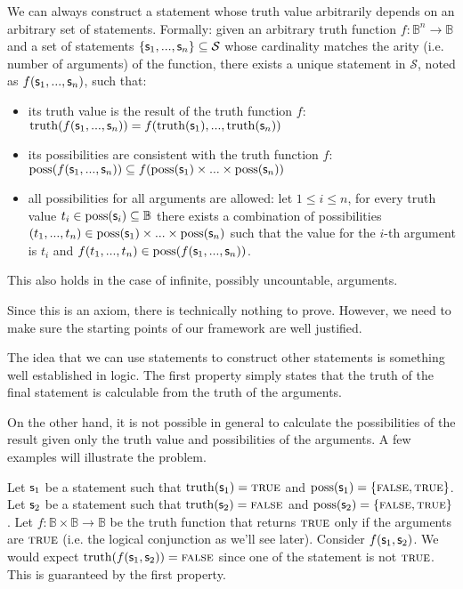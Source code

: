 \documentclass[11pt,letterpaper,fleqn]{memoir} %
\begin{document}
\begin{mathSection}
	\begin{axiom}\label{def_functions_of_statement}
		We can always construct a statement whose truth value arbitrarily depends on an arbitrary set of statements. Formally: given an arbitrary truth function $f : \mathbb{B}^n \to \mathbb{B}$ and a set of statements $\{\mathsf{s}_1, ..., \mathsf{s}_n\} \subseteq \mathcal{S}$  whose cardinality matches the arity (i.e. number of arguments) of the function, there exists a unique statement in $\mathcal{S}$, noted as $f(\mathsf{s}_1, ..., \mathsf{s}_n)$, such that:
		\begin{itemize}
			\item its truth value is the result of the truth function $f$: \newline $\operatorname{truth}(f(\mathsf{s}_1, ..., \mathsf{s}_n)) = f(\operatorname{truth}(\mathsf{s}_1), ..., \operatorname{truth}(\mathsf{s}_n))$
			\item its possibilities are consistent with the truth function $f$: \newline $\operatorname{poss}(f(\mathsf{s}_1, ..., \mathsf{s}_n)) \subseteq f(\operatorname{poss}(\mathsf{s}_1) \times ... \times \operatorname{poss}(\mathsf{s}_n))$
			\item all possibilities for all arguments are allowed:
			\newline let $1 \leq i \leq n$, for every truth value $t_i \in \operatorname{poss}(\mathsf{s}_i) \subseteq \mathbb{B}$ there exists a combination of possibilities $(t_1, ..., t_n) \in \operatorname{poss}(\mathsf{s}_1) \times ... \times \operatorname{poss}(\mathsf{s}_n)$ such that the value for the $i$-th argument is $t_i$ and  $f(t_1, ..., t_n) \in \operatorname{poss}(f(\mathsf{s}_1, ..., \mathsf{s}_n))$.
		\end{itemize}
	This also holds in the case of infinite, possibly uncountable, arguments.
	\end{axiom}
	\begin{justification}
		Since this is an axiom, there is technically nothing to prove. However, we need to make sure the starting points of our framework are well justified.
		
		The idea that we can use statements to construct other statements is something well established in logic. The first property simply states that the truth of the final statement is calculable from the truth of the arguments.
		
		On the other hand, it is not possible in general to calculate the possibilities of the result given only the truth value and possibilities of the arguments. A few examples will illustrate the problem.
		
		Let $\mathsf{s}_1$ be a statement such that $\operatorname{truth}(\mathsf{s}_1) = \textsc{true}$ and $\operatorname{poss}(\mathsf{s}_1) = \{\textsc{false}, \textsc{true}\}$. Let $\mathsf{s}_2$ be a statement such that $\operatorname{truth}(\mathsf{s}_2) = \textsc{false}$ and $\operatorname{poss}(\mathsf{s}_2) = \{\textsc{false}, \textsc{true}\}$. Let $f : \mathbb{B} \times \mathbb{B} \to \mathbb{B}$ be the truth function that returns $\textsc{true}$ only if the arguments are $\textsc{true}$ (i.e. the logical conjunction as we'll see later). Consider $f(\mathsf{s}_1, \mathsf{s}_2)$. We would expect $\operatorname{truth}(f(\mathsf{s}_1, \mathsf{s}_2)) = \textsc{false}$ since one of the statement is not $\textsc{true}$. This is guaranteed by the first property.
		

\end{justification}
\end{mathSection}
\end{document}
